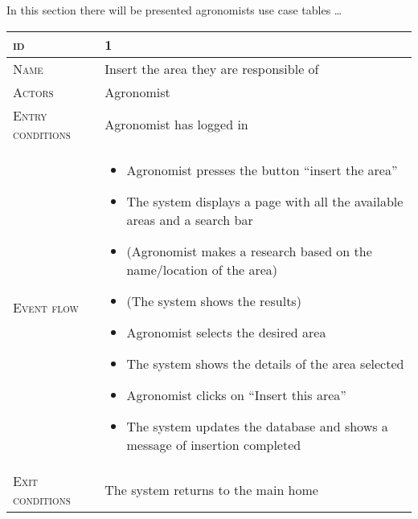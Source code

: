 In this section there will be presented agronomists use case tables \ldots
\begin{table}[H]
    \centering
    \begin{tabular}[c]{|l|p{}|}
        \hline %
    	\textsc{id}                 &   1\\
    	\hline %
    	\textsc{Name}               &   Insert the area they are responsible of\\
    	\hline %
    	\textsc{Actors}             &   Agronomist\\
    	\hline %
    	\textsc{Entry conditions}   &   Agronomist has logged in\\
    	\hline %
    	\textsc{Event flow}         &   \footnotesize
            	                        \begin{itemize}
                                    	    \item Agronomist presses the button “insert the area”
                                    		\item The system displays a page with all the available areas and a search bar
                                    		\item (Agronomist makes a research based on the name/location of the area)
                                    		\item (The system shows the results)
                                    		\item Agronomist selects the desired area
                                    		\item The system shows the details of the area selected
                                    		\item Agronomist clicks on “Insert this area”
                                    		\item The system updates the database and shows a message of insertion completed
                                        \end{itemize}\\
        \hline %
        \textsc{Exit conditions}    &  The system returns to the main home\\

\end{tabular}
\end{table}
